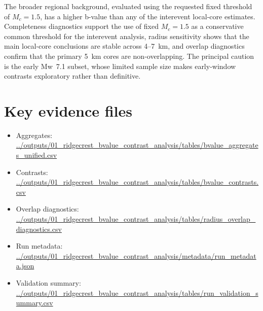 \documentclass[11pt]{article}
\begin{document}
The broader regional background, evaluated using the requested fixed threshold of $M_c=1.5$, has a higher b-value than any of the interevent local-core estimates. Completeness diagnostics support the use of fixed $M_c=1.5$ as a conservative common threshold for the interevent analysis, radius sensitivity shows that the main local-core conclusions are stable across 4--7~km, and overlap diagnostics confirm that the primary 5~km cores are non-overlapping. The principal caution is the early Mw~7.1 subset, whose limited sample size makes early-window contrasts exploratory rather than definitive.

\section*{Key evidence files}
\begin{itemize}
    \item Aggregates: \url{../outputs/01_ridgecrest_bvalue_contrast_analysis/tables/bvalue_aggregates_unified.csv}
    \item Contrasts: \url{../outputs/01_ridgecrest_bvalue_contrast_analysis/tables/bvalue_contrasts.csv}
    \item Overlap diagnostics: \url{../outputs/01_ridgecrest_bvalue_contrast_analysis/tables/radius_overlap_diagnostics.csv}
    \item Run metadata: \url{../outputs/01_ridgecrest_bvalue_contrast_analysis/metadata/run_metadata.json}
    \item Validation summary: \url{../outputs/01_ridgecrest_bvalue_contrast_analysis/tables/run_validation_summary.csv}
\end{itemize}
\end{document}
